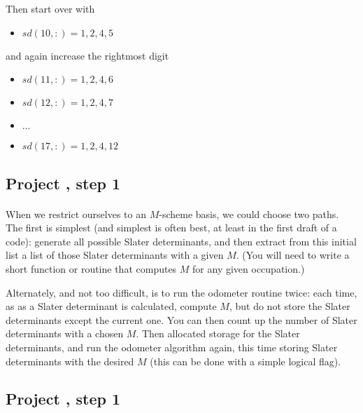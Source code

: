 \documentclass[%
twoside,                 %
final,                   %
10pt]{article}
\begin{document}
\noindent
Then start over with 
\begin{itemize}
\item $sd(10,:)= 1,2,4,5$
\end{itemize}

\noindent
and again increase the rightmost digit

\begin{itemize}
\item $sd(11,:)= 1,2,4,6$

\item $sd(12,:)= 1,2,4,7$

\item $\ldots$

\item $sd(17,:)= 1,2,4,12$
\end{itemize}

\noindent



\subsection*{Project , step 1}

\paragraph{}
When we restrict ourselves to an $M$-scheme basis, we could choose two paths. 
The first is simplest (and simplest is often best, at 
least in the first draft of a code): generate all possible Slater determinants, 
and then extract from this initial list a list of those Slater determinants with a given 
$M$. (You will need to write a short function or routine that computes $M$ for any 
given occupation.)  


Alternately, and not too difficult, is to run the odometer routine twice: each time, as 
as a Slater determinant is calculated, compute $M$, but do not store the Slater determinants 
except the current one. You can then count up the number of Slater determinants with a 
chosen $M$.  Then allocated storage for the Slater determinants, and run the odometer 
algorithm again, this time storing Slater determinants with the desired $M$ (this can be 
done with a simple logical flag).




\subsection*{Project , step 1}
\end{document}
